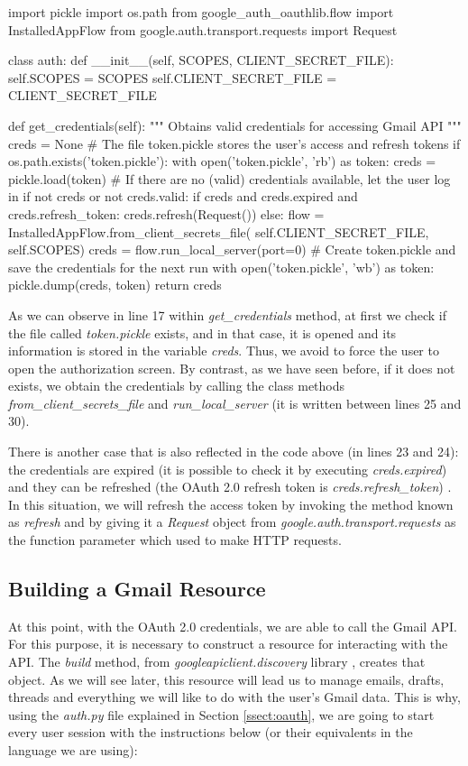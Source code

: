 \begin{pythonnum}
	import pickle
	import os.path
	from google_auth_oauthlib.flow import InstalledAppFlow
	from google.auth.transport.requests import Request
	
	class auth:
	def __init__(self, SCOPES, CLIENT_SECRET_FILE):
	self.SCOPES = SCOPES
	self.CLIENT_SECRET_FILE = CLIENT_SECRET_FILE
	
	def get_credentials(self):
	"""
	Obtains valid credentials for accessing Gmail API
	"""
	creds = None
	# The file token.pickle stores the user's access and refresh tokens
	if os.path.exists('token.pickle'):
	with open('token.pickle', 'rb') as token:
	creds = pickle.load(token)
	# If there are no (valid) credentials available, let the user log in
	if not creds or not creds.valid:
	if creds and creds.expired and creds.refresh_token:
	creds.refresh(Request())
	else:
	flow = InstalledAppFlow.from_client_secrets_file(
	self.CLIENT_SECRET_FILE, self.SCOPES)
	creds = flow.run_local_server(port=0)
	# Create token.pickle and save the credentials for the next run
	with open('token.pickle', 'wb') as token:
	pickle.dump(creds, token)
	return creds
	
\end{pythonnum}

As we can observe in line 17 within \textit{get\_credentials} method, at first we check if the file called \textit{token.pickle} exists, and in that case, it is opened and its information is stored in the variable \textit{creds}. Thus, we avoid to force the user to open the authorization screen. By contrast, as we have seen before, if it does not exists, we obtain the credentials by calling the class methods \textit{from\_client\_secrets\_file} and \textit{run\_local\_server} (it is written between lines 25 and 30).

There is another case that is also reflected in the code above (in lines 23 and 24): the credentials are expired (it is possible to check it by executing \textit{creds.expired}) and they can be refreshed (the OAuth 2.0 refresh token is \textit{creds.refresh\_token}) \citep{oauth2.credentials}. In this situation, we will refresh the access token by invoking the method known as \textit{refresh} and by giving it a \textit{Request} object \citep{request-lib} from \textit{google.auth.transport.requests} as the function parameter which used to make HTTP requests.

\subsection{Building a Gmail Resource} \label{ssect:gmailres}
At this point, with the OAuth 2.0 credentials, we are able to call the Gmail API. For this purpose, it is necessary to construct a resource \citep[/v1/reference]{gmailAPI} for interacting with the API. The \textit{build} method, from \textit{googleapiclient.discovery} library \citep{build-module}, creates that object. As we will see later, this resource will lead us to manage emails, drafts, threads and everything we will like to do with the user's Gmail data. This is why, using the \textit{auth.py} file explained in Section \ref{ssect:oauth}, we are going to start every user session with the instructions below (or their equivalents in the language we are using):

